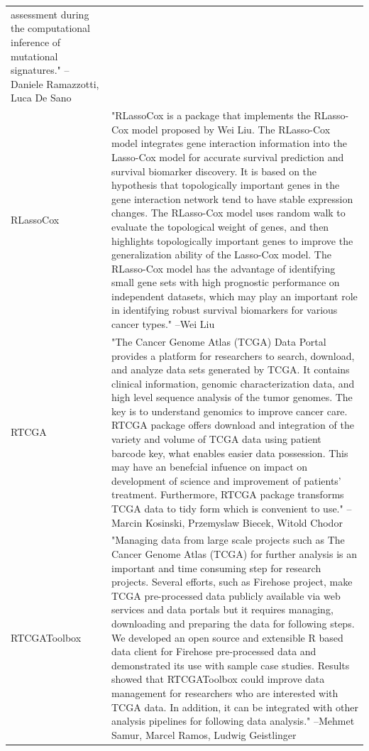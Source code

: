 \begin{longtable}[t]{l>{\raggedright\arraybackslash}p{25em}}
assessment during the computational inference of mutational
signatures." --Daniele Ramazzotti, Luca De Sano\\
RLassoCox & "RLassoCox is a package that implements the RLasso-Cox
model proposed by Wei Liu. The RLasso-Cox model integrates gene
interaction information into the Lasso-Cox model for accurate
survival prediction and survival biomarker discovery. It is
based on the hypothesis that topologically important genes in
the gene interaction network tend to have stable expression
changes. The RLasso-Cox model uses random walk to evaluate the
topological weight of genes, and then highlights topologically
important genes to improve the generalization ability of the
Lasso-Cox model. The RLasso-Cox model has the advantage of
identifying small gene sets with high prognostic performance on
independent datasets, which may play an important role in
identifying robust survival biomarkers for various cancer
types." --Wei Liu\\
\addlinespace
RTCGA & "The Cancer Genome Atlas (TCGA) Data Portal provides a
platform for researchers to search, download, and analyze data
sets generated by TCGA. It contains clinical information,
genomic characterization data, and high level sequence analysis
of the tumor genomes. The key is to understand genomics to
improve cancer care. RTCGA package offers download and
integration of the variety and volume of TCGA data using
patient barcode key, what enables easier data possession. This
may have an benefcial infuence on impact on development of
science and improvement of patients' treatment. Furthermore,
RTCGA package transforms TCGA data to tidy form which is
convenient to use." --Marcin Kosinski, Przemyslaw Biecek, Witold Chodor\\
RTCGAToolbox & "Managing data from large scale projects such as The Cancer
Genome Atlas (TCGA) for further analysis is an important and
time consuming step for research projects. Several efforts,
such as Firehose project, make TCGA pre-processed data publicly
available via web services and data portals but it requires
managing, downloading and preparing the data for following
steps. We developed an open source and extensible R based data
client for Firehose pre-processed data and demonstrated its use
with sample case studies. Results showed that RTCGAToolbox
could improve data management for researchers who are
interested with TCGA data. In addition, it can be integrated
with other analysis pipelines for following data analysis." --Mehmet Samur, Marcel Ramos, Ludwig Geistlinger\\

\end{longtable}
